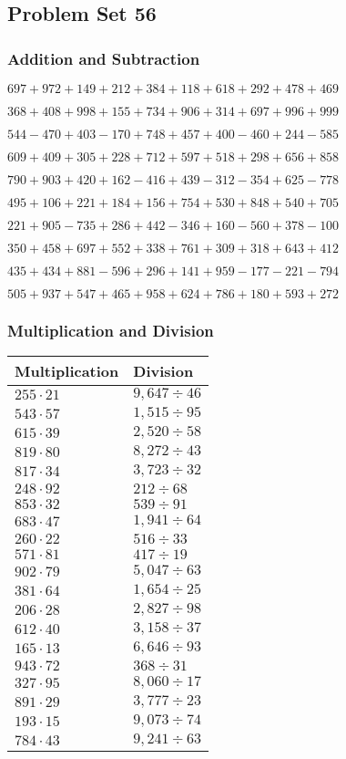 \hypertarget{problem-set-56-1}{%
\subsection{Problem Set 56}\label{problem-set-56-1}}

\hypertarget{addition-and-subtraction-156}{%
\subsubsection{Addition and
Subtraction}\label{addition-and-subtraction-156}}

\(697 + 972 + 149 + 212 + 384 + 118 + 618 + 292 + 478 + 469\)

\(368 + 408 + 998 + 155 + 734 + 906 + 314 + 697 + 996 + 999\)

\(544 - 470 + 403 - 170 + 748 + 457 + 400 - 460 + 244 - 585\)

\(609 + 409 + 305 + 228 + 712 + 597 + 518 + 298 + 656 + 858\)

\(790 + 903 + 420 + 162 - 416 + 439 - 312 - 354 + 625 - 778\)

\(495 + 106 + 221 + 184 + 156 + 754 + 530 + 848 + 540 + 705\)

\(221 + 905 - 735 + 286 + 442 - 346 + 160 - 560 + 378 - 100\)

\(350 + 458 + 697 + 552 + 338 + 761 + 309 + 318 + 643 + 412\)

\(435 + 434 + 881 - 596 + 296 + 141 + 959 - 177 - 221 - 794\)

\(505 + 937 + 547 + 465 + 958 + 624 + 786 + 180 + 593 + 272\)

\hypertarget{multiplication-and-division-156}{%
\subsubsection{Multiplication and
Division}\label{multiplication-and-division-156}}

\begin{longtable}[]{@{}ll@{}}
\toprule
Multiplication & Division\tabularnewline
\midrule
\endhead
\(255 \cdot 21\) & \(9,647÷46\)\tabularnewline
\(543 \cdot 57\) & \(1,515÷95\)\tabularnewline
\(615 \cdot 39\) & \(2,520÷58\)\tabularnewline
\(819 \cdot 80\) & \(8,272÷43\)\tabularnewline
\(817 \cdot 34\) & \(3,723÷32\)\tabularnewline
\(248 \cdot 92\) & \(212÷68\)\tabularnewline
\(853 \cdot 32\) & \(539÷91\)\tabularnewline
\(683 \cdot 47\) & \(1,941÷64\)\tabularnewline
\(260 \cdot 22\) & \(516÷33\)\tabularnewline
\(571 \cdot 81\) & \(417÷19\)\tabularnewline
\(902 \cdot 79\) & \(5,047÷63\)\tabularnewline
\(381 \cdot 64\) & \(1,654÷25\)\tabularnewline
\(206 \cdot 28\) & \(2,827÷98\)\tabularnewline
\(612 \cdot 40\) & \(3,158÷37\)\tabularnewline
\(165 \cdot 13\) & \(6,646÷93\)\tabularnewline
\(943 \cdot 72\) & \(368÷31\)\tabularnewline
\(327 \cdot 95\) & \(8,060÷17\)\tabularnewline
\(891 \cdot 29\) & \(3,777÷23\)\tabularnewline
\(193 \cdot 15\) & \(9,073÷74\)\tabularnewline
\(784 \cdot 43\) & \(9,241÷63\)\tabularnewline
\bottomrule
\end{longtable}

